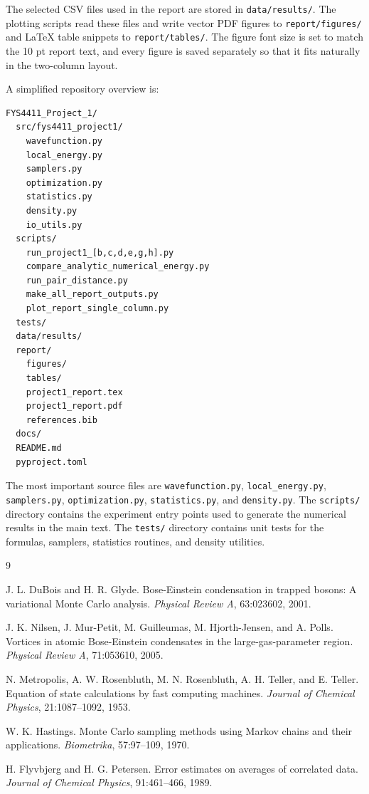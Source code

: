 \documentclass[10pt,a4paper]{article}
\newcommand{\code}[1]{\texttt{#1}}
\begin{document}
The selected CSV files used in the report are stored in \code{data/results/}.
The plotting scripts read these files and write vector PDF figures to
\code{report/figures/} and \LaTeX{} table snippets to \code{report/tables/}.
The figure font size is set to match the 10 pt report text, and every figure is
saved separately so that it fits naturally in the two-column layout.

\newpage
A simplified repository overview is:

\begin{lstlisting}
FYS4411_Project_1/
  src/fys4411_project1/
    wavefunction.py
    local_energy.py
    samplers.py
    optimization.py
    statistics.py
    density.py
    io_utils.py
  scripts/
    run_project1_[b,c,d,e,g,h].py
    compare_analytic_numerical_energy.py
    run_pair_distance.py
    make_all_report_outputs.py
    plot_report_single_column.py
  tests/
  data/results/
  report/
    figures/
    tables/
    project1_report.tex
    project1_report.pdf
    references.bib
  docs/
  README.md
  pyproject.toml
\end{lstlisting}

The most important source files are \code{wavefunction.py},
\code{local\_energy.py}, \code{samplers.py}, \code{optimization.py},
\code{statistics.py}, and \code{density.py}. The \code{scripts/} directory
contains the experiment entry points used to generate the numerical results in
the main text. The \code{tests/} directory contains unit tests for the formulas,
samplers, statistics routines, and density utilities.


\begin{thebibliography}{9}

J. L. DuBois and H. R. Glyde.
\newblock Bose-Einstein condensation in trapped bosons: A variational Monte Carlo analysis.
\newblock \emph{Physical Review A}, 63:023602, 2001.

J. K. Nilsen, J. Mur-Petit, M. Guilleumas, M. Hjorth-Jensen, and A. Polls.
\newblock Vortices in atomic Bose-Einstein condensates in the large-gas-parameter region.
\newblock \emph{Physical Review A}, 71:053610, 2005.

N. Metropolis, A. W. Rosenbluth, M. N. Rosenbluth, A. H. Teller, and E. Teller.
\newblock Equation of state calculations by fast computing machines.
\newblock \emph{Journal of Chemical Physics}, 21:1087--1092, 1953.

W. K. Hastings.
\newblock Monte Carlo sampling methods using Markov chains and their applications.
\newblock \emph{Biometrika}, 57:97--109, 1970.

H. Flyvbjerg and H. G. Petersen.
\newblock Error estimates on averages of correlated data.
\newblock \emph{Journal of Chemical Physics}, 91:461--466, 1989.

\end{thebibliography}
\end{document}

